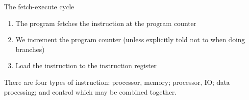 \begin{highlight}{The fetch-execute cycle}
\end{highlight}
\begin{enumerate}
    \item The program fetches the instruction at the program counter
    \item We increment the program counter (unless explicitly told not to when doing branches)
    \item Load the instruction to the instruction register
\end{enumerate}
%
There are four types of instruction: processor, memory; processor, IO; data processing; and control which may be combined together.
